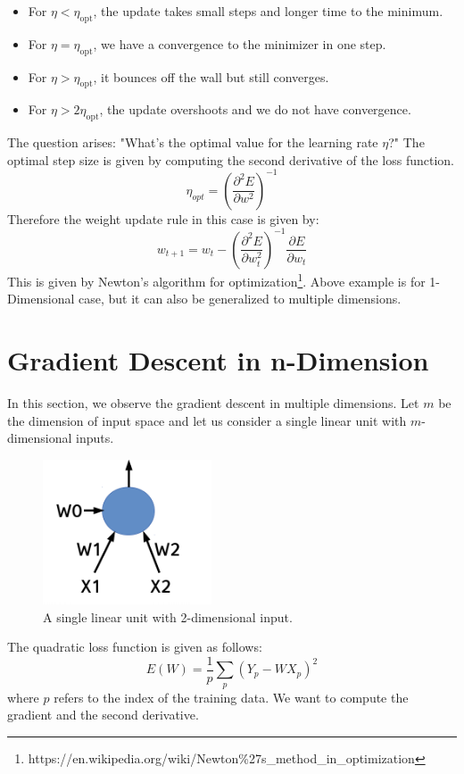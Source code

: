 \begin{itemize}
    \item For $\eta < \eta_{\textrm{opt}}$, the update takes small steps and longer time to the minimum.
    \item For $\eta=\eta_{\textrm{opt}}$, we have a convergence to the minimizer in one step.
    \item For $\eta > \eta_{\textrm{opt}}$, it bounces off the wall but still converges.
    \item For $\eta > 2 \eta_{\textrm{opt}}$, the update overshoots and we do not have convergence.
    
\end{itemize}

The question arises: "What's the optimal value for the learning rate $\eta$?" The optimal step size is given by computing the second derivative of the loss function.
$$ \eta_{opt} = (\frac{\partial^2 E}{\partial w^2})^{-1} $$
Therefore the weight update rule in this case is given by:
$$ w_{t+1} = w_t - (\frac{\partial^2 E}{\partial w_{t}^2})^{-1}\frac{\partial E}{\partial w_t}  $$
This is given by Newton's algorithm for optimization\footnote{https://en.wikipedia.org/wiki/Newton\%27s\_method\_in\_optimization}. Above example is for 1-Dimensional case, but it can also be generalized to multiple dimensions.


\section{Gradient Descent in n-Dimension}

In this section, we observe the gradient descent in multiple dimensions. Let $m$ be the dimension of input space and let us consider a single linear unit with $m$-dimensional inputs.
\begin{figure}[t]
\centering
\includegraphics[width=50mm]{lectures/07-a/su.png}
\caption{A single linear unit with 2-dimensional input.}
\end{figure}
The quadratic loss function is given as follows: 
$$ E(W)= \frac{1}{p}\sum_{p}(Y_{p} - WX_{p})^2$$
where $p$ refers to the index of the training data. We want to compute the gradient and the second derivative.

